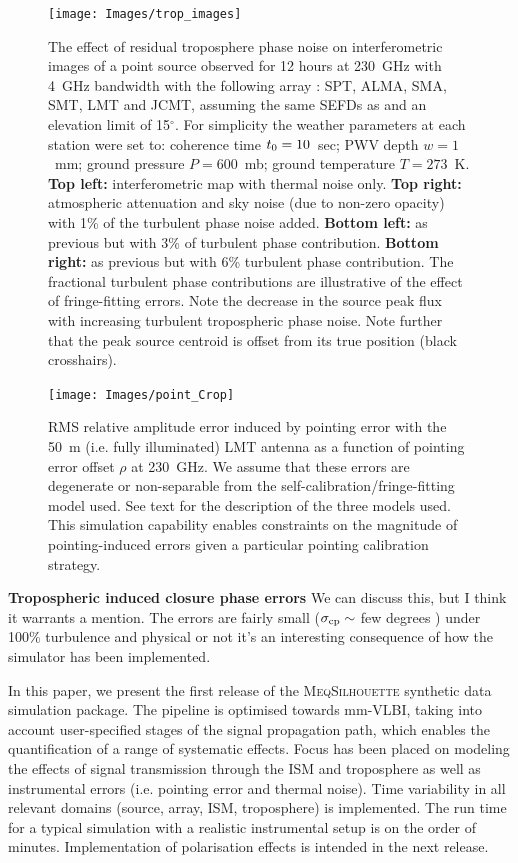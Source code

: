 \begin{figure}
\begin{center}
\texttt{[image: Images/trop\_images]}
\caption{The effect of residual troposphere phase noise on interferometric images of a point source observed for 12 hours at 230~GHz with 4~GHz bandwidth with the following array : SPT, ALMA, SMA, SMT, LMT and JCMT, assuming the same SEFDs as \protect\citet{Lu_2014} and an elevation limit of 15$^\circ$. For simplicity the weather parameters at each station were set to: coherence time $t_{\rm 0}=10$~sec; PWV depth $w=1$~mm; ground pressure $P=600$~mb; ground temperature $T =273$~K. {\bf Top left:} interferometric map with thermal noise only. {\bf Top right:} atmospheric attenuation and sky noise (due to non-zero opacity) with 1\% of the turbulent phase noise added. {\bf Bottom left:} as previous but with 3\% of turbulent phase contribution. {\bf Bottom right:} as previous but with 6\% turbulent phase contribution. The fractional turbulent phase contributions are illustrative of the effect of fringe-fitting errors. Note the decrease in the source peak flux with increasing turbulent tropospheric phase noise. Note further that the peak source centroid is offset from its true position (black crosshairs). \label{fig:trop_images}%
}
\end{center}
\end{figure}


\begin{figure}
\begin{center}
\texttt{[image: Images/point\_Crop]}
\caption{RMS relative amplitude error induced by pointing error with the 50~m (i.e. fully illuminated) LMT antenna as a function of pointing error offset $\rho$ at 230~GHz. We assume that these errors are degenerate or non-separable from the self-calibration/fringe-fitting model used. See text for the description of the three models used. This simulation capability enables constraints on the magnitude of pointing-induced errors given a particular pointing calibration strategy.\label{fig:pointing}%
}
\end{center}
\end{figure}


{\bf Tropospheric induced closure phase errors}
 We can discuss this, but I think it warrants a mention. The errors are fairly small ($\sigma_{\rm cp} \sim$ few degrees ) under 100\% turbulence and physical or not it's an interesting consequence of how the simulator has been implemented.
 
 
In this paper, we present the first release of the \textsc{MeqSilhouette} synthetic data simulation package. The pipeline is optimised towards mm-VLBI, taking into account user-specified stages of the signal propagation path, which enables the quantification of a range of systematic effects. Focus has been placed on modeling the effects of signal transmission through the ISM and troposphere as well as instrumental errors (i.e. pointing error and thermal noise). Time variability in all relevant domains (source, array, ISM, troposphere) is implemented. The run time for a typical simulation with a realistic instrumental setup is on the order of minutes.  Implementation of polarisation effects is intended in the next release. 


